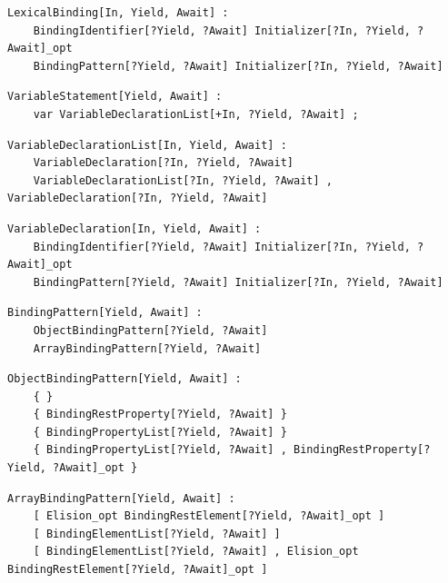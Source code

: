 \noindent\textbf{\texttt{}}\par
\begin{lstlisting}
LexicalBinding[In, Yield, Await] :
    BindingIdentifier[?Yield, ?Await] Initializer[?In, ?Yield, ?Await]_opt
    BindingPattern[?Yield, ?Await] Initializer[?In, ?Yield, ?Await]
\end{lstlisting}

\noindent\textbf{\texttt{}}\par
\begin{lstlisting}
VariableStatement[Yield, Await] :
    var VariableDeclarationList[+In, ?Yield, ?Await] ;
\end{lstlisting}

\noindent\textbf{\texttt{}}\par
\begin{lstlisting}
VariableDeclarationList[In, Yield, Await] :
    VariableDeclaration[?In, ?Yield, ?Await]
    VariableDeclarationList[?In, ?Yield, ?Await] , VariableDeclaration[?In, ?Yield, ?Await]
\end{lstlisting}

\noindent\textbf{\texttt{}}\par
\begin{lstlisting}
VariableDeclaration[In, Yield, Await] :
    BindingIdentifier[?Yield, ?Await] Initializer[?In, ?Yield, ?Await]_opt
    BindingPattern[?Yield, ?Await] Initializer[?In, ?Yield, ?Await]
\end{lstlisting}

\noindent\textbf{\texttt{}}\par
\begin{lstlisting}
BindingPattern[Yield, Await] :
    ObjectBindingPattern[?Yield, ?Await]
    ArrayBindingPattern[?Yield, ?Await]
\end{lstlisting}

\noindent\textbf{\texttt{}}\par
\begin{lstlisting}
ObjectBindingPattern[Yield, Await] :
    { }
    { BindingRestProperty[?Yield, ?Await] }
    { BindingPropertyList[?Yield, ?Await] }
    { BindingPropertyList[?Yield, ?Await] , BindingRestProperty[?Yield, ?Await]_opt }
\end{lstlisting}

\noindent\textbf{\texttt{}}\par
\begin{lstlisting}
ArrayBindingPattern[Yield, Await] :
    [ Elision_opt BindingRestElement[?Yield, ?Await]_opt ]
    [ BindingElementList[?Yield, ?Await] ]
    [ BindingElementList[?Yield, ?Await] , Elision_opt BindingRestElement[?Yield, ?Await]_opt ]
\end{lstlisting}

